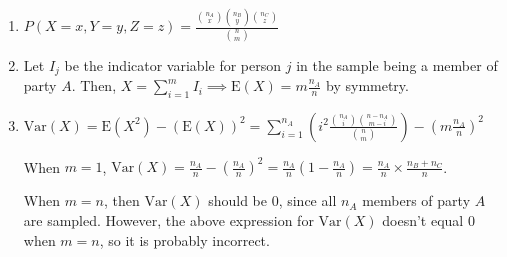 \begin{enumerate}[label=(\alph*)]
\item $P(X=x,Y=y,Z=z) = \frac{\binom{n_{A}}{x}\binom{n_{B}}{y}\binom{n_{C}}{z}}
{\binom{n}{m}}$

\item Let $I_{j}$ be the indicator variable for person $j$ in the sample being a
member of party $A$. Then, $X = \sum_{i=1}^{m}I_{i} \implies \text{E}(X) =
m\frac{n_{A}}{n}$ by symmetry.

\item $\text{Var}(X) = \text{E}(X^{2}) - (\text{E}(X))^{2} = \sum_{i=1}^{n_{A}}
(i^{2}
\frac{\binom{n_{A}}{i}\binom{n - n_{A}}{m-i}}{\binom{n}{m}}) - (m\frac{n_{A}}
{n})^{2}$

When $m=1$, $\text{Var}(X) = \frac{n_{A}}{n} - (\frac{n_{A}}{n})^{2} = \frac{n_
{A}}{n}(1 - \frac{n_{A}}{n}) = \frac{n_{A}}{n} \times \frac{n_{B} + n_{C}}{n}$.

When $m=n$, then $\text{Var}(X)$ should be $0$, since all $n_{A}$ members of
party $A$ are sampled. However, the above expression for $\text{Var}(X)$
doesn't equal $0$ when $m=n$, so it is probably incorrect.
\end{enumerate}